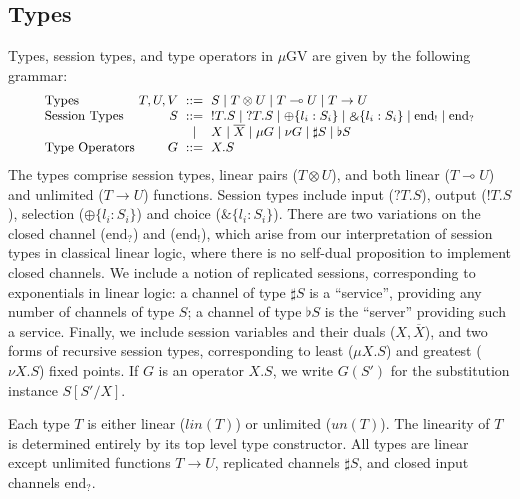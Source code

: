 \documentclass[orivec,envcountsame]{llncs}
\newcommand{\with}{\mathbin\binampersand}
\newcommand{\gvdual}[1]{\overline{#1}}
\newcommand{\gvout}[2]{{!#1.#2}}
\newcommand{\gvin}[2]{{?#1.#2}}
\newcommand{\lto}{\ensuremath{\multimap}}
\newcommand{\uto}{\ensuremath{\rightarrow}}
\newcommand{\outterm}{\mathrm{end}_!}
\newcommand{\interm}{\mathrm{end}_?}
\newcommand{\gvserver}[1]{\flat #1}
\newcommand{\gvservice}[1]{\sharp #1}
\newcommand{\un}{un}
\newcommand{\lin}{lin}
\newcommand{\mugv}{$\mu\mathrm{GV}$\xspace}
\begin{document}
\subsection{Types}
\label{sec:mugv-types}

Types, session types, and type operators in \mugv are given by the following grammar:
\[
\small
\begin{array}{l@{\hspace{1mm}}r@{\hspace{2mm}}c@{\hspace{2mm}}l}
  \text{Types}         & T,U,V & ::= & S \mid T \otimes U \mid T \lto U \mid T \uto U \\
  \text{Session Types} & S     & ::= & \gvout{T}{S} \mid \gvin{T}{S}
                                \mid   \oplus \{ l_i : S_i \} \mid \with \{ l_i : S_i \}
                                \mid   \outterm \mid \interm \\
                            & & \mid & X \mid \gvdual{X}
                                \mid   \mu G \mid \nu G
                                \mid   \gvservice{S} \mid \gvserver{S} \\
  \text{Type Operators} & G    & ::= & X.S %
\end{array}
\]%
%
The types comprise session types, linear pairs ($T \otimes U$), and both linear ($T \lto U$) and
unlimited ($T \uto U$) functions.
%
Session types include input ($\gvin{T}{S}$), output ($\gvout{T}{S}$), selection ($\oplus\{ l_i:S_i
\}$) and choice ($\with\{l_i:S_i\}$). There are two variations on the closed channel ($\interm$) and
($\outterm$), which arise from our interpretation of session types in classical linear logic, where
there is no self-dual proposition to implement closed channels. We include a notion of replicated
sessions, corresponding to exponentials in linear logic: a channel of type $\gvservice{S}$ is a
``service'', providing any number of channels of type $S$; a channel of type $\gvserver{S}$ is the
``server'' providing such a service. Finally, we include session variables and their duals
($X,\gvdual{X}$), and two forms of recursive session types, corresponding to least ($\mu X.S$) and
greatest ($\nu X.S$) fixed points. If $G$ is an operator $X.S$, we write $G(S')$ for the
substitution instance $S[S'/X]$.

Each type $T$ is either linear ($\lin(T)$) or unlimited ($\un(T)$). The linearity of $T$ is
determined entirely by its top level type constructor.
%
All types are linear except unlimited functions $T \uto U$, replicated channels $\gvservice{S}$, and
closed input channels $\interm$.
\end{document}
